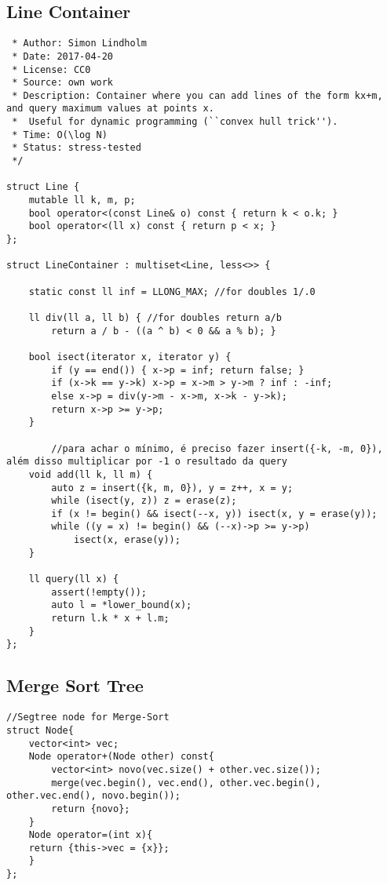 \documentclass[11pt, a4paper, twoside]{article}
\begin{document}
\subsection{Line Container}
\begin{verbatim}
 * Author: Simon Lindholm
 * Date: 2017-04-20
 * License: CC0
 * Source: own work
 * Description: Container where you can add lines of the form kx+m, and query maximum values at points x.
 *  Useful for dynamic programming (``convex hull trick'').
 * Time: O(\log N)
 * Status: stress-tested
 */

struct Line {
	mutable ll k, m, p;
	bool operator<(const Line& o) const { return k < o.k; }
	bool operator<(ll x) const { return p < x; }
}; 

struct LineContainer : multiset<Line, less<>> {
    
	static const ll inf = LLONG_MAX; //for doubles 1/.0
    	
    ll div(ll a, ll b) { //for doubles return a/b
		return a / b - ((a ^ b) < 0 && a % b); }
    
	bool isect(iterator x, iterator y) {
		if (y == end()) { x->p = inf; return false; }
		if (x->k == y->k) x->p = x->m > y->m ? inf : -inf;
		else x->p = div(y->m - x->m, x->k - y->k);
		return x->p >= y->p;
	} 
    	
        //para achar o mínimo, é preciso fazer insert({-k, -m, 0}), além disso multiplicar por -1 o resultado da query
    void add(ll k, ll m) {
		auto z = insert({k, m, 0}), y = z++, x = y;
		while (isect(y, z)) z = erase(z);
		if (x != begin() && isect(--x, y)) isect(x, y = erase(y));
		while ((y = x) != begin() && (--x)->p >= y->p) 
			isect(x, erase(y));
	}
    
	ll query(ll x) {
		assert(!empty());
        auto l = *lower_bound(x);
		return l.k * x + l.m;
	}
};
\end{verbatim}

\subsection{Merge Sort Tree}
\begin{verbatim}
//Segtree node for Merge-Sort
struct Node{
    vector<int> vec;
    Node operator+(Node other) const{
        vector<int> novo(vec.size() + other.vec.size());
        merge(vec.begin(), vec.end(), other.vec.begin(), other.vec.end(), novo.begin());
        return {novo};
    }
    Node operator=(int x){
    return {this->vec = {x}};
    }
};
\end{verbatim}
\end{document}
